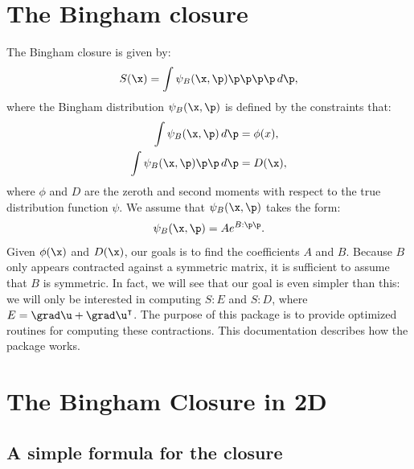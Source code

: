 \documentclass{article}
\begin{document}
\section{The Bingham closure}

The Bingham closure is given by:
\begin{equation}
    S(\x) = \int\psi_B(\x,\p)\p\p\p\p\,d\p,
\end{equation}
where the Bingham distribution $\psi_B(\x,\p)$ is defined by the constraints that:
\begin{subequations}
    \begin{align}
        \int\psi_B(\x,\p)\,d\p      &= \phi(x),  \\
        \int\psi_B(\x,\p)\p\p\,d\p  &= D(\x),
    \end{align}
\end{subequations}
where $\phi$ and $D$ are the zeroth and second moments with respect to the true distribution function $\psi$. We assume that $\psi_B(\x,\p)$ takes the form:
\begin{align}
    \psi_B(\x,\p) = Ae^{B:\p\p}.
\end{align}
Given $\phi(\x)$ and $D(\x)$, our goals is to find the coefficients $A$ and $B$. Because $B$ only appears contracted against a symmetric matrix, it is sufficient to assume that $B$ is symmetric. In fact, we will see that our goal is even simpler than this: we will only be interested in computing $S:E$ and $S:D$, where $E=\grad\u+\grad\u^\intercal$. The purpose of this package is to provide optimized routines for computing these contractions. This documentation describes how the package works.

\section{The Bingham Closure in 2D}

\subsection{A simple formula for the closure}
\end{document}
